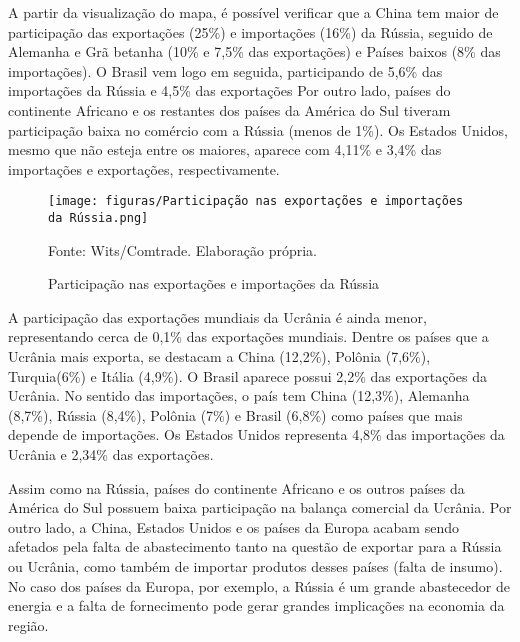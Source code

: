 \documentclass[
article, %
12pt, %
oneside, %
a4paper, %
portuguese, %
portuguese %
]{abntex2}
\begin{document}

A partir da visualização do mapa, é possível verificar que a China tem maior de participação das exportações (25\%) e importações (16\%) da Rússia, seguido de Alemanha e Grã betanha (10\% e 7,5\% das exportações) e Países baixos (8\% das importações). O Brasil vem logo em seguida, participando de 5,6\% das importações da Rússia e 4,5\% das exportações Por outro lado, países do continente Africano e os restantes dos países da América do Sul tiveram participação baixa no comércio com a Rússia (menos de 1\%). Os Estados Unidos, mesmo que não esteja entre os maiores, aparece com 4,11\% e 3,4\% das importações e exportações, respectivamente.

\begin{figure}[H]
    \centering
    \caption{Participação nas exportações e importações da Rússia}
    \texttt{[image: figuras/Participação nas exportações e importações da Rússia.png]}
    \begin{flushleft}
    Fonte: Wits/Comtrade. Elaboração própria.
    \end{flushleft}
    \label{fig:01}
\end{figure}

A participação das exportações mundiais da Ucrânia é ainda menor, representando cerca de 0,1\% das exportações mundiais. Dentre os países que a Ucrânia mais exporta, se destacam a China (12,2\%), Polônia (7,6\%), Turquia(6\%) e Itália (4,9\%). O Brasil aparece possui 2,2\% das exportações da Ucrânia. No sentido das importações, o país tem China (12,3\%), Alemanha (8,7\%), Rússia (8,4\%), Polônia (7\%) e Brasil (6,8\%) como países que mais depende de importações. Os Estados Unidos representa 4,8\% das importações da Ucrânia e 2,34\% das exportações.

Assim como na Rússia, países do continente Africano e os outros países da América do Sul possuem baixa participação na balança comercial da Ucrânia. Por outro lado, a China, Estados Unidos e os países da Europa acabam sendo afetados pela falta de abastecimento tanto na questão de exportar para a Rússia ou Ucrânia, como também de importar produtos desses países (falta de insumo). No caso dos países da Europa, por exemplo, a Rússia é um grande abastecedor de energia e a falta de fornecimento pode gerar grandes implicações na economia da região.
\end{document}
